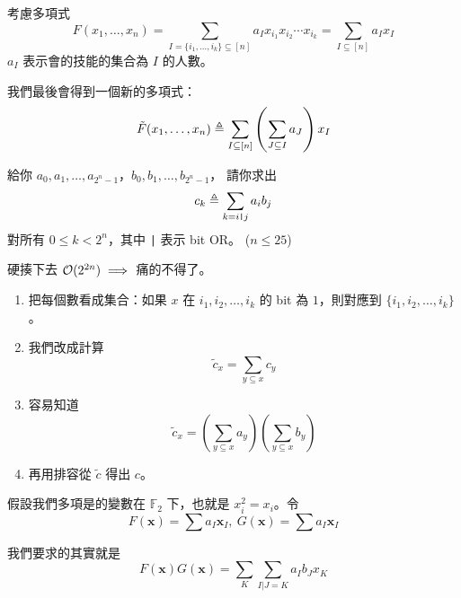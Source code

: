 \documentclass[standalone]{beamer}
\begin{document}
\begin{frame}{}
  考慮多項式
  \[ F(x_1, \dots, x_n) = \sum_{I = \{i_1, \dots, i_k\} \subseteq [n]} a_I x_{i_1} x_{i_2} \cdots x_{i_k}
  = \sum_{I \subseteq [n]} a_I x_I \]
  $a_I$ 表示會的技能的集合為 $I$ 的人數。 \pause

  我們最後會得到一個新的多項式：
  \[ \tilde{F}(x_1, \dots, x_n) \triangleq \sum_{I \subseteq [n]} \left( \sum_{J \subseteq I} a_J \right) x_I \]
\end{frame}


\begin{frame}{}
  \begin{problem}
    給你 $a_0, a_1, \dots, a_{2^n-1}$，$b_0, b_1, \dots, b_{2^n-1}$，
    請你求出
    \[ c_k \triangleq \sum_{k = i \texttt{|} j} a_i b_j \]
    對所有 $0 \leq k < 2^n$，其中 \texttt{|} 表示 bit OR。 ($n \leq 25$)
  \end{problem} \pause
  硬揍下去 $\mathcal{O}(2^{2n}) \implies$ 痛的不得了。
\end{frame}

\begin{frame}{}
  \begin{enumerate}[<+->]
    \item 把每個數看成集合：如果 $x$ 在 $i_1, i_2, \dots, i_k$ 的 bit 為 $1$，則對應到
      $\{i_1, i_2, \dots, i_k\}$。
    \item 我們改成計算
      \[ \tilde{c}_x = \sum_{y \subseteq x} c_y \]
    \item 容易知道
      \[ \tilde{c}_x = \left(\sum_{y \subseteq x} a_y\right) \left(\sum_{y \subseteq x} b_y\right)\]
    \item 再用排容從 $\tilde{c}$ 得出 $c$。
  \end{enumerate}
\end{frame}

\begin{frame}{}
  假設我們多項是的變數在 $\mathbb{F}_2$ 下，也就是 $x_i^2 = x_i$。令
    \[ F(\bm{x}) = \sum a_I \bm{x}_I,\ G(\bm{x}) = \sum a_I \bm{x}_I \]
  \pause

  我們要求的其實就是
  \[ F(\bm{x}) G(\bm{x}) = \sum_K \sum_{I \texttt{|} J = K} a_I b_J x_K \]
\end{frame}
\end{document}
